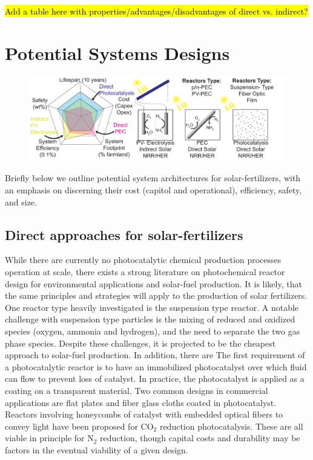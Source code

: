 \hl{Add a table here with properties/advantages/disadvantages of direct vs. indirect?}

\section{Potential Systems Designs}
\begin{figure}
    \centering
    \includegraphics[width=1\textwidth]{Figures/Systems.pdf}
    \caption{}
    \label{fig:systems}
\end{figure}

 Briefly below we outline potential system architectures for solar-fertilizers, with an emphasis on discerning their cost (capitol and operational), efficiency, safety, and size.

\subsection*{Direct approaches for solar-fertilizers}

While there are currently no photocatalytic chemical production processes operation at scale, there exists a strong literature on photochemical reactor design for environmental applications and solar-fuel production.\cite{Mckone_2013,Birnie2006,walter_2010} It is likely, that the same principles and strategies will apply to the production of solar fertilizers. One reactor type heavily investigated is the suspension type reactor. A notable challenge with suspension type particles is the mixing of reduced and oxidized species (oxygen, ammonia and hydrogen), and the need to separate the two gas phase species. Despite these challenges, it is projected to be the cheapest approach to solar-fuel production.  In addition, there are  The first requirement of a photocatalytic reactor is to have an immobilized photocatalyst over which fluid can flow to prevent loss of catalyst. In practice, the photocatalyst is applied as a coating on a transparent material. Two common designs in commercial applications are flat plates\cite{Brandi_1999} and fiber glass cloths\cite{Horikoshi_2002} coated in photocatalyst. Reactors involving honeycombs of catalyst with embedded optical fibers to convey light have been proposed for CO$_2$ reduction photocatalysis.\cite{Ola_2015} These are all viable in principle for N$_2$ reduction, though capital costs and durability may be factors in the eventual viability of a given design.

